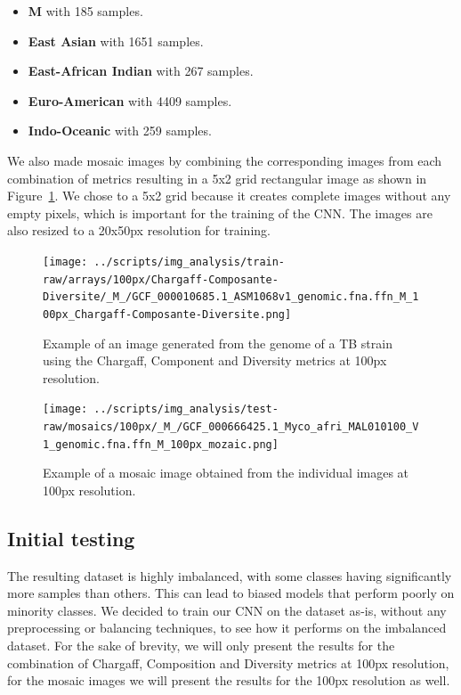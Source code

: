 \begin{itemize}
	\item \textbf{M} with 185 samples.
	\item \textbf{East Asian} with 1651 samples.
	\item \textbf{East-African Indian} with 267 samples.
	\item \textbf{Euro-American} with 4409 samples.
	\item \textbf{Indo-Oceanic} with 259 samples.
\end{itemize}

We also made mosaic images by combining the corresponding images from each combination of metrics resulting in a 5x2 grid rectangular image as shown
in Figure~\ref{fig:mosaic_example}. We chose to a 5x2 grid because it creates complete images without any empty pixels, which is important for the
training of the CNN. The images are also resized to a 20x50px resolution for training.

\begin{figure}[H]
	\centering
	\begin{minipage}[t]{0.48\textwidth}
		\centering
		\texttt{[image: ../scripts/img\_analysis/train-raw/arrays/100px/Chargaff-Composante-Diversite/\_M\_/GCF\_000010685.1\_ASM1068v1\_genomic.fna.ffn\_M\_100px\_Chargaff-Composante-Diversite.png]}
		\caption{Example of an image generated from the genome of a TB strain using the Chargaff, Component and Diversity metrics at 100px resolution.}
		\label{fig:example_image}
	\end{minipage}\hfill
	\begin{minipage}[t]{0.48\textwidth}
		\centering
		\texttt{[image: ../scripts/img\_analysis/test-raw/mosaics/100px/\_M\_/GCF\_000666425.1\_Myco\_afri\_MAL010100\_V1\_genomic.fna.ffn\_M\_100px\_mozaic.png]}
		\caption{Example of a mosaic image obtained from the individual images at 100px resolution.}
		\label{fig:mosaic_example}
	\end{minipage}
\end{figure}


\subsection{Initial testing}
\label{subsec:initial_testing}

The resulting dataset is highly imbalanced, with some classes having significantly more samples than others. This can lead to biased models
that perform poorly on minority classes. We decided to train our CNN on the dataset as-is, without any preprocessing or balancing techniques,
to see how it performs on the imbalanced dataset. For the sake of brevity, we will only present the results for the combination of Chargaff,
Composition and Diversity metrics at 100px resolution, for the mosaic images we will present the results for the 100px resolution as well.

